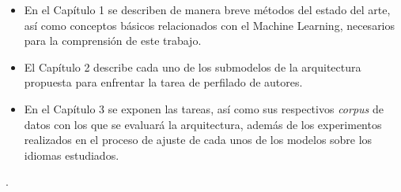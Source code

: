 \begin{itemize}
	\item En el Capítulo 1 se describen de manera breve métodos del estado del arte, así como conceptos básicos relacionados con el Machine Learning, necesarios para la comprensión de este trabajo.
	\item El Capítulo 2 describe cada uno de los submodelos de la arquitectura propuesta para enfrentar la tarea de perfilado de autores.
	\item En el Capítulo 3 se exponen las tareas, así como sus respectivos \textit{corpus} de datos con los que se evaluará la arquitectura, además de  los experimentos realizados en el proceso de ajuste de cada unos de los modelos sobre los idiomas estudiados. 
\end{itemize}
. 